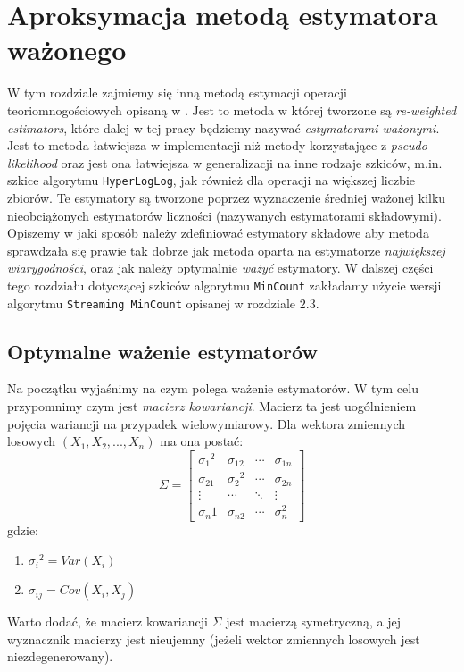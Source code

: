 \chapter{Aproksymacja metodą estymatora ważonego}
\thispagestyle{chapterBeginStyle}

W tym rozdziale zajmiemy się inną metodą estymacji operacji teoriomnogościowych opisaną w \cite{ting}. Jest to metoda w której tworzone są \textit{re-weighted estimators}, które dalej w tej pracy będziemy nazywać \textit{estymatorami ważonymi}. Jest to metoda łatwiejsza w implementacji niż metody korzystające z \textit{pseudo-likelihood} oraz jest ona łatwiejsza w generalizacji na inne rodzaje szkiców, m.in. szkice algorytmu \texttt{HyperLogLog}, jak również dla operacji na większej liczbie zbiorów. Te estymatory są tworzone poprzez wyznaczenie średniej ważonej kilku nieobciążonych estymatorów liczności (nazywanych estymatorami składowymi). Opiszemy w jaki sposób należy zdefiniować estymatory składowe aby metoda sprawdzała się prawie tak dobrze jak metoda oparta na estymatorze \textit{największej wiarygodności}, oraz jak należy optymalnie \textit{ważyć} estymatory. W dalszej części tego rozdziału dotyczącej szkiców algorytmu \texttt{MinCount} zakładamy użycie wersji algorytmu \texttt{Streaming MinCount} opisanej w rozdziale $2.3$.

\section{Optymalne ważenie estymatorów}
Na początku wyjaśnimy na czym polega ważenie estymatorów.
W tym celu przypomnimy czym jest \textit{macierz kowariancji}. Macierz ta jest uogólnieniem pojęcia wariancji na przypadek wielowymiarowy. Dla wektora zmiennych losowych $(X_1, X_2, ..., X_n)$ ma ona postać:
\[
\Sigma =
  \begin{bmatrix}
    {{\sigma}_1}^2 & {\sigma}_{12} & \cdots & {\sigma}_{1n}  \\
    {{\sigma}_21} & {{\sigma}_{2}}^2 & \cdots & {\sigma}_{2n} \\
    \vdots & \cdots & \ddots & \vdots \\
    {{\sigma}_n1} & {{\sigma}_{n2}} & \cdots & {{\sigma}_{n}^2}
  \end{bmatrix}
\]
gdzie:
\begin{enumerate}
    \item ${{\sigma}_i}^2 = Var(X_i)$
    \item ${\sigma}_{ij} = Cov(X_i, X_j)$
\end{enumerate}
Warto dodać, że macierz kowariancji $\Sigma$ jest macierzą symetryczną, a jej wyznacznik macierzy jest nieujemny (jeżeli wektor zmiennych losowych jest niezdegenerowany).
\newline

